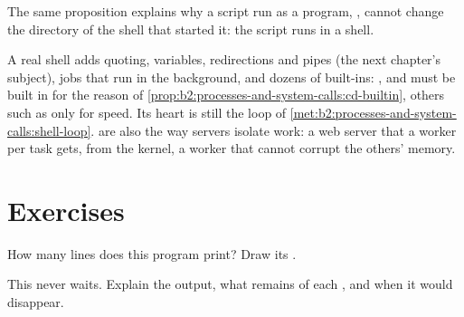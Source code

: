 

The same proposition explains why a script run as a program, , cannot change the directory of the
shell that started it: the script runs in a  shell.

\begin{inpractice}
A real shell adds quoting, variables, redirections and pipes (the next chapter's subject), jobs that run in the
background, and dozens of built-ins: ,  and  must be built in for the reason of
\cref{prop:b2:processes-and-system-calls:cd-builtin}, others such as  only for speed. Its heart is still
the loop of \cref{met:b2:processes-and-system-calls:shell-loop}.  are also the way servers isolate work:
a web server that  a worker per task gets, from the kernel, a worker that cannot corrupt the others' memory.
\end{inpractice}

\section{Exercises}\label{sec:b2:processes-and-system-calls:exercises}

\begin{exercise}[$\star$]\label{exo:b2:processes-and-system-calls:1}
How many lines does this program print? Draw its .
\end{exercise}

\begin{exercise}[$\star$]\label{exo:b2:processes-and-system-calls:2}
This  never waits. Explain the output, what remains of each , and when it would disappear.
\end{exercise}

